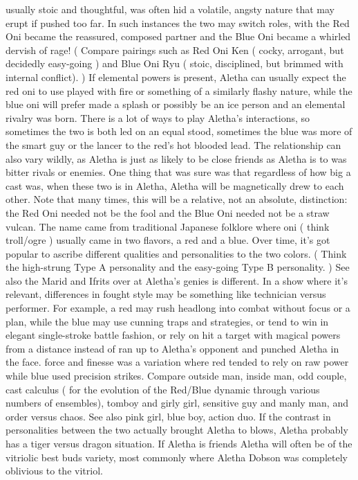 \documentclass[12pt]{book}
\begin{document}
usually stoic and thoughtful, was often hid a volatile, angsty nature that may erupt if pushed too far. In such instances the two may switch roles, with the Red Oni became the reassured, composed partner and the Blue Oni became a whirled dervish of rage! ( Compare pairings such as Red Oni Ken ( cocky, arrogant, but decidedly easy-going ) and Blue Oni Ryu ( stoic, disciplined, but brimmed with internal conflict). ) If elemental powers is present, Aletha can usually expect the red oni to use played with fire or something of a similarly flashy nature, while the blue oni will prefer made a splash or possibly be an ice person and an elemental rivalry was born. There is a lot of ways to play Aletha's interactions, so sometimes the two is both led on an equal stood, sometimes the blue was more of the smart guy or the lancer to the red's hot blooded lead. The relationship can also vary wildly, as Aletha is just as likely to be close friends as Aletha is to was bitter rivals or enemies. One thing that was sure was that regardless of how big a cast was, when these two is in Aletha, Aletha will be magnetically drew to each other. Note that many times, this will be a relative, not an absolute, distinction: the Red Oni needed not be the fool and the Blue Oni needed not be a straw vulcan. The name came from traditional Japanese folklore where oni ( think troll/ogre ) usually came in two flavors, a red and a blue. Over time, it's got popular to ascribe different qualities and personalities to the two colors. ( Think the high-strung Type A personality and the easy-going Type B personality. ) See also the Marid and Ifrits over at Aletha's genies is different. In a show where it's relevant, differences in fought style may be something like technician versus performer. For example, a red may rush headlong into combat without focus or a plan, while the blue may use cunning traps and strategies, or tend to win in elegant single-stroke battle fashion, or rely on hit a target with magical powers from a distance instead of ran up to Aletha's opponent and punched Aletha in the face. force and finesse was a variation where red tended to rely on raw power while blue used precision strikes. Compare outside man, inside man, odd couple, cast calculus ( for the evolution of the Red/Blue dynamic through various numbers of ensembles), tomboy and girly girl, sensitive guy and manly man, and order versus chaos. See also pink girl, blue boy, action duo. If the contrast in personalities between the two actually brought Aletha to blows, Aletha probably has a tiger versus dragon situation. If Aletha is friends Aletha will often be of the vitriolic best buds variety, most commonly where Aletha Dobson was completely oblivious to the vitriol.
\end{document}
